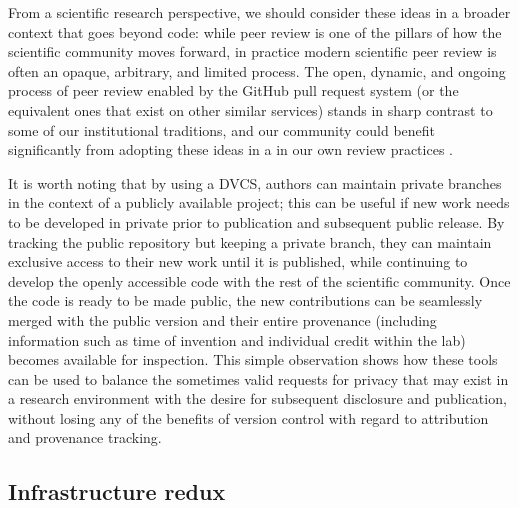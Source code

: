 \documentclass[ChapterTOCs,krantz2]{krantz} %
\begin{document}
From a scientific research perspective, we should consider these ideas in a
broader context that goes beyond code: while peer review is one of the pillars
of how the scientific community moves forward, in practice modern scientific
peer review is often an opaque, arbitrary, and limited process.  The open,
dynamic, and ongoing process of peer review enabled by the GitHub pull request
system (or the equivalent ones that exist on other similar services) stands in
sharp contrast to some of our institutional traditions, and our community could
benefit significantly from adopting these ideas in a in our own review
practices \cite{10.3389/fncom.2012.00018}.

It is worth noting that by using a DVCS, authors can maintain private branches
in the context of a publicly available project; this can be useful if new work
needs to be developed in private prior to publication and subsequent public
release. By tracking the public repository but keeping a private branch, they
can maintain exclusive access to their new work until it is published, while
continuing to develop the openly accessible code with the rest of the
scientific community. Once the code is ready to be made public, the new
contributions can be seamlessly merged with the public version and their entire
provenance (including information such as time of invention and individual
credit within the lab) becomes available for inspection.  This simple
observation shows how these tools can be used to balance the sometimes valid
requests for privacy that may exist in a research environment with the desire
for subsequent disclosure and publication, without losing any of the benefits
of version control with regard to attribution and provenance tracking.

\subsection{Infrastructure redux}
\end{document}
